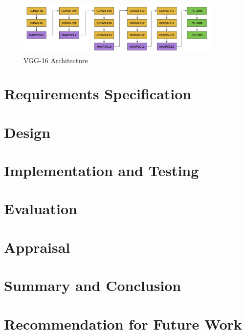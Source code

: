 \documentclass[12pt,a4paper]{report}
\begin{document}
\begin{itemize}
\begin{figure}[h]
\centering
\includegraphics[width=0.9\textwidth]{vgg16.png}
\caption{VGG-16 Architecture}
\end{figure}

\end{itemize}
\newpage
\section{Requirements Specification}
\section{Design}
\section{Implementation and Testing}
\section{Evaluation}
\section{Appraisal}
\section{Summary and Conclusion}
\section{Recommendation for Future Work}
\end{document}
